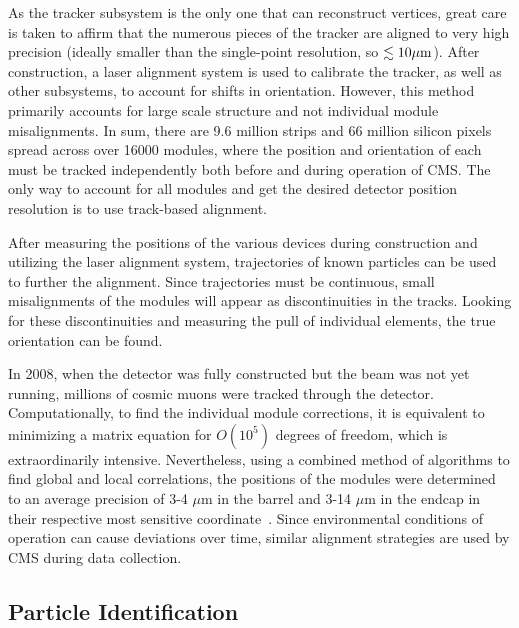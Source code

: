 As the tracker subsystem is the only one that can reconstruct vertices, great care is taken to affirm that the numerous pieces of the tracker are aligned to very high precision (ideally smaller than the single-point resolution, so $\lesssim10\mu\rm{m}$). After construction, a laser alignment system is used to calibrate the tracker, as well as other subsystems, to account for shifts in orientation. However, this method primarily accounts for large scale structure and not individual module misalignments. In sum, there are 9.6 million strips and 66 million silicon pixels spread across over 16000 modules, where the position and orientation of each must be tracked independently both before and during operation of CMS. The only way to account for all modules and get the desired detector position resolution is to use track-based alignment.

After measuring the positions of the various devices during construction and utilizing the laser alignment system, trajectories of known particles can be used to further the alignment. Since trajectories must be continuous, small misalignments of the modules will appear as discontinuities in the tracks. Looking for these discontinuities and measuring the pull of individual elements, the true orientation can be found.

In 2008, when the detector was fully constructed but the beam was not yet running, millions of cosmic muons were tracked through the detector. Computationally, to find the individual module corrections, it is equivalent to minimizing a matrix equation for $O(10^5)$ degrees of freedom, which is extraordinarily intensive. Nevertheless, using a combined method of algorithms to find global and local correlations, the positions of the modules were determined to an average precision of 3-4 $\mu$m in the barrel and 3-14 $\mu$m in the endcap in their respective most sensitive coordinate~\cite{}. Since environmental conditions of operation can cause deviations over time, similar alignment strategies are used by CMS during data collection.

\subsection{Particle Identification}
\label{sec:ParticleID}

